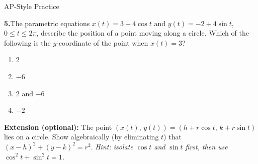 \documentclass[10pt]{article}
\begin{document}
\begin{notesbox}{AP-Style Practice}

\textbf{5.}\quad The parametric equations $x(t) = 3 + 4\cos t$ and
$y(t) = -2 + 4\sin t$, $0 \le t \le 2\pi$, describe the position of
a point moving along a circle. Which of the following is the
$y$-coordinate of the point when $x(t) = 3$?

\vspace{6pt}
\begin{enumerate}[label=(\Alph*), leftmargin=2em, itemsep=4pt]
  \item $2$
  \item $-6$
  \item $2$ and $-6$
  \item $-2$
\end{enumerate}

\end{notesbox}

\vspace{0.08in}

\begin{extensionbox}
\textbf{Extension (optional):} The point $(x(t),\,y(t)) = (h+r\cos t,\,k+r\sin t)$
lies on a circle. Show algebraically (by eliminating $t$) that $(x-h)^2 + (y-k)^2 = r^2$.
\textit{Hint: isolate $\cos t$ and $\sin t$ first, then use $\cos^2 t + \sin^2 t = 1$.}
\end{extensionbox}
\end{document}
